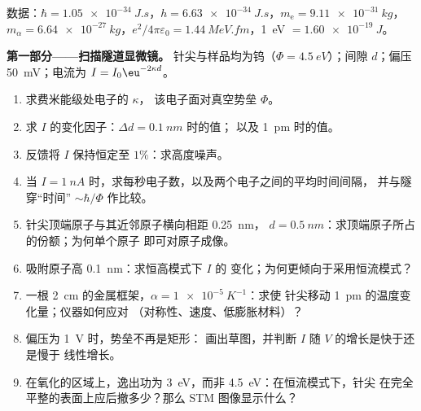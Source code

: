 \begin{problem}\label{pb:b2:potential-wells-tunneling:1}
数据：$\hbar = \qty{1.05e-34}{J.s}$，$h = \qty{6.63e-34}{J.s}$，$m_{\text{e}} =
\qty{9.11e-31}{kg}$，$m_\alpha = \qty{6.64e-27}{kg}$，$e^2/4\pi\varepsilon_0 =
\qty{1.44}{MeV.fm}$，\qty{1}{eV} $= \qty{1.60e-19}{J}$。

\textbf{第一部分——扫描隧道显微镜。}
针尖与样品均为钨（$\Phi = \qty{4.5}{eV}$）；间隙 $d$；偏压
\qty{50}{mV}；电流为 $I = I_0\eu^{-2\kappa d}$。
\begin{enumerate}
  \item 求费米能级处电子的 $\kappa$，
        该电子面对真空势垒 $\Phi$。
  \item 求 $I$ 的变化因子：$\Delta d = \qty{0.1}{nm}$ 时的值；
        以及 \qty{1}{pm} 时的值。
  \item 反馈将 $I$ 保持恒定至 $1\%$：求高度噪声。
  \item 当 $I = \qty{1}{nA}$ 时，求每秒电子数，以及两个电子之间的平均时间间隔，
        并与隧穿“时间” $\sim\hbar/\Phi$ 作比较。
  \item 针尖顶端原子与其近邻原子横向相距 \qty{0.25}{nm}，
        $d = \qty{0.5}{nm}$：求顶端原子所占的份额；为何单个原子
        即可对原子成像。
  \item 吸附原子高 \qty{0.1}{nm}：求恒高模式下 $I$ 的
        变化；为何更倾向于采用恒流模式？
  \item 一根 \qty{2}{cm} 的金属框架，$\alpha = \qty{1e-5}{K^{-1}}$：求使
        针尖移动 \qty{1}{pm} 的温度变化量；仪器如何应对
        （对称性、速度、低膨胀材料）？
  \item 偏压为 \qty{1}{V} 时，势垒不再是矩形：
        画出草图，并判断 $I$ 随 $V$ 的增长是快于还是慢于
        线性增长。
  \item 在氧化的区域上，逸出功为 \qty{3}{eV}，而非
        \qty{4.5}{eV}：在恒流模式下，针尖
        在完全平整的表面上应后撤多少？那么
        STM 图像显示什么？
\end{enumerate}


\end{problem}
